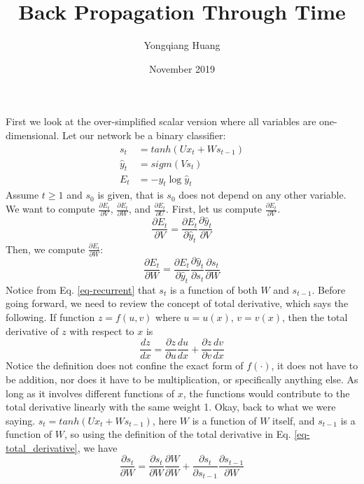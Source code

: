 \documentclass{article}
\title{Back Propagation Through Time}
\author{Yongqiang Huang}
\date{November 2019}
\begin{document}
\maketitle

First we look at the over-simplified scalar version where all variables are one-dimensional. Let our network be a binary classifier:
\begin{align}
    s_t &= tanh(Ux_t + Ws_{t-1}) \label{eq-recurrent} \\
    \hat{y}_t &= sigm(Vs_t) \\
    E_t &= -y_t\log \hat{y}_t
\end{align}
Assume $t \geq 1$ and $s_0$ is given, that is $s_0$ does not depend on any other variable. We want to compute $\frac{\partial E_t}{\partial V}$, $\frac{\partial E_t}{\partial W}$, and  $\frac{\partial E_t}{\partial U}$. First, let us compute $\frac{\partial E_t}{\partial V}$. 
\begin{equation}
    \frac{\partial E_t}{\partial V} = \frac{\partial E_t}{\partial \hat{y}_t}\frac{\partial \hat{y}_t}{\partial V}
\end{equation}
Then, we compute $\frac{\partial E_t}{\partial W}$:
\begin{equation}
    \frac{\partial E_t}{\partial W} = \frac{\partial E_t}{\partial \hat{y}_t}\frac{\partial \hat{y}_t}{\partial s_t}\frac{\partial s_t}{\partial W}
\end{equation}
Notice from Eq. \eqref{eq-recurrent} that $s_t$ is a function of both $W$ and $s_{t-1}$. Before going forward, we need to review the concept of total derivative, which says the following. If function $z = f(u, v)$ where $u = u(x)$, $v = v(x)$, then the total derivative of $z$ with respect to $x$ is
\begin{equation} \label{eq-total_derivative}
    \frac{dz}{dx} = \frac{\partial z}{\partial u}\frac{du}{dx} + \frac{\partial z}{\partial v}\frac{dv}{dx}
\end{equation}
Notice the definition does not confine the exact form of $f(\cdot)$, it does not have to be addition, nor does it have to be multiplication, or specifically anything else. As long as it involves different functions of $x$, the functions would contribute to the total derivative linearly with the same weight 1. Okay, back to what we were saying. $s_t = tanh(Ux_t + Ws_{t-1})$, here $W$ is a function of $W$ itself, and $s_{t-1}$ is a function of $W$, so using the definition of the total derivative in Eq. \eqref{eq-total_derivative}, we have 
\begin{equation}
    \frac{\partial s_t}{\partial W} = \frac{\partial s_t}{\partial W}\frac{\partial W}{\partial W}  + \frac{\partial s_t}{\partial s_{t-1}}\frac{\partial s_{t-1}}{\partial W}   
\end{equation}
\end{document}
